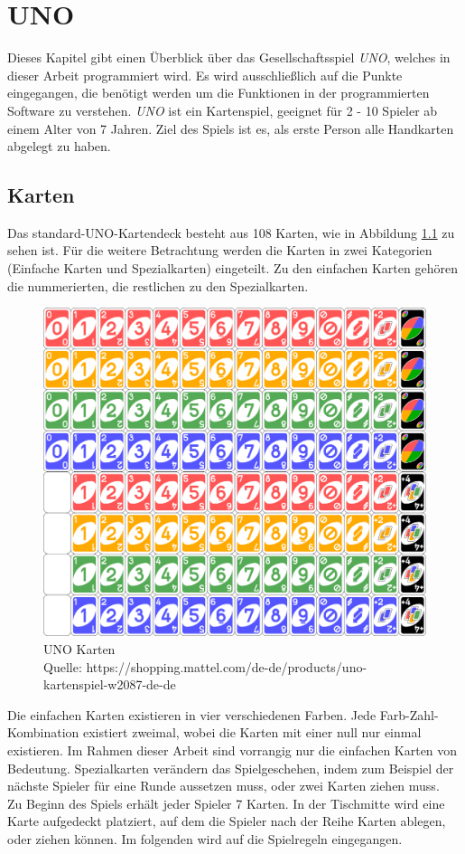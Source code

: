 
\chapter{UNO}
\label{ch:uno}
Dieses Kapitel gibt einen Überblick über das Gesellschaftsspiel \textit{UNO}, welches in dieser Arbeit programmiert wird. Es wird ausschließlich auf die Punkte eingegangen, die benötigt werden um die Funktionen in der programmierten Software zu verstehen. \textit{UNO} ist ein Kartenspiel, geeignet für 2 - 10 Spieler ab einem Alter von 7 Jahren. Ziel des Spiels ist es, als erste Person alle Handkarten abgelegt zu haben.
\section{Karten}
\label{ch:karten}
Das standard-UNO-Kartendeck besteht aus 108 Karten, wie in Abbildung \ref{fig:uno_cards} zu sehen ist. Für die weitere Betrachtung werden die Karten in zwei Kategorien (Einfache Karten und Spezialkarten) eingeteilt. Zu den einfachen Karten gehören die nummerierten, die restlichen zu den Spezialkarten. 
\begin{figure}[h]
\begin{center}
	\includegraphics[width=.5\linewidth]{bilder/UNO_cards_deck.png}
	\caption{UNO Karten \\Quelle: https://shopping.mattel.com/de-de/products/uno-kartenspiel-w2087-de-de}
	\label{fig:uno_cards}
\end{center}
\end{figure}
Die einfachen Karten existieren in vier verschiedenen Farben. Jede Farb-Zahl-Kombination existiert zweimal, wobei die Karten mit einer null nur einmal existieren. Im Rahmen dieser Arbeit sind vorrangig nur die einfachen Karten von Bedeutung. Spezialkarten verändern das Spielgeschehen, indem zum Beispiel der nächste Spieler für eine Runde aussetzen muss, oder zwei Karten ziehen muss. \\
Zu Beginn des Spiels erhält jeder Spieler 7 Karten. In der Tischmitte wird eine Karte aufgedeckt platziert, auf dem die Spieler nach der Reihe Karten ablegen, oder ziehen können. Im folgenden wird auf die Spielregeln eingegangen.
